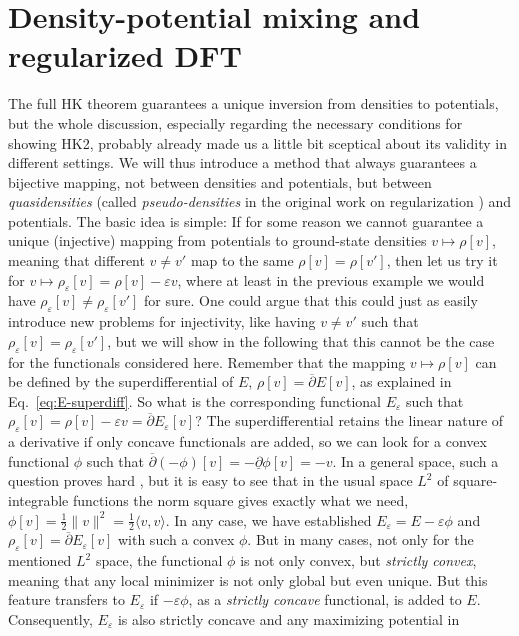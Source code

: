 \documentclass[journal=apcach,manuscript=article,layout=twocolumn]{achemso}
\newcommand{\eps}{\varepsilon}
\begin{document}
\section{Density-potential mixing and regularized DFT}
\label{sec:regDFT}

The full HK theorem guarantees a unique inversion from densities to potentials, but the whole discussion, especially regarding the necessary conditions for showing HK2, probably already made us a little bit sceptical about its validity in different settings. We will thus introduce a method that always guarantees a bijective mapping, not between densities and potentials, but between \emph{quasidensities} (called \emph{pseudo-densities} in the original work on regularization \cite{Kvaal2014}) and potentials. The basic idea is simple: If for some reason we cannot guarantee a unique (injective) mapping from potentials to ground-state densities $v\mapsto\rho[v]$, meaning that different $v\neq v'$ map to the same $\rho[v] = \rho[v']$, then let us try it for $v \mapsto \rho_\eps[v] = \rho[v] - \eps v$, where at least in the previous example we would have $\rho_\eps[v] \neq \rho_\eps[v']$ for sure. One could argue that this could just as easily introduce new problems for injectivity, like having $v\neq v'$ such that $\rho_\eps[v] = \rho_\eps[v']$, but we will show in the following that this cannot be the case for the functionals considered here. Remember that the mapping $v \mapsto \rho[v]$ can be defined by the superdifferential of $E$, $\rho[v] = \overline\partial E[v]$, as explained in Eq.~\eqref{eq:E-superdiff}. So what is the corresponding functional $E_\eps$ such that $\rho_\eps[v] = \rho[v]-\eps v = \overline\partial E_\eps[v]$? The superdifferential retains the linear nature of a derivative if only concave functionals are added, so we can look for a convex functional $\phi$ such that $\overline\partial (-\phi)[v] = -\underline\partial \phi[v] = -v$. In a general space, such a question proves hard \cite{penz2020convergence}, but it is easy to see that in the usual space $L^2$ of square-integrable functions the norm square gives exactly what we need, $\phi[v] = \tfrac{1}{2}\|v\|^2 = \tfrac{1}{2}\langle v,v \rangle$. In any case, we have established $E_\eps = E - \eps \phi$ and $\rho_\eps[v] = \overline\partial E_\eps[v]$ with such a convex $\phi$. But in many cases, not only for the mentioned $L^2$ space, the functional $\phi$ is not only convex, but \emph{strictly convex}, meaning that any local minimizer is not only global but even unique. But this feature transfers to $E_\eps$ if $-\eps \phi$, as a \emph{strictly concave} functional, is added to $E$. Consequently, $E_\eps$ is also strictly concave and any maximizing potential in
\end{document}
